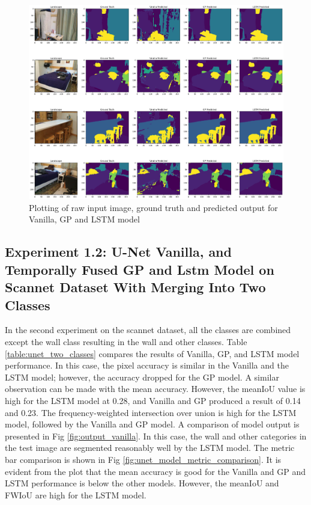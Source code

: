 	\begin{figure}
		\centering
		\includegraphics[width=16cm]{images/unet_scannet_all_classes.png}
		\caption{Plotting of raw input image, ground truth and predicted output for Vanilla, GP and LSTM model}
		\label{fig:unet_model}
	\end{figure}

	\newpage
		
    \subsection{Experiment 1.2: U-Net Vanilla, and Temporally Fused GP and Lstm Model on Scannet Dataset With Merging Into Two Classes}
    
	In the second experiment on the scannet dataset, all the classes are combined except the wall class resulting in the wall and other classes. Table \ref{table:unet_two_classes} compares the results of Vanilla, GP, and LSTM model performance. In this case, the pixel accuracy is similar in the Vanilla and the LSTM model; however, the accuracy dropped for the GP model. A similar observation can be made with the mean accuracy. However, the meanIoU value is high for the LSTM model at 0.28, and Vanilla and GP produced a result of 0.14 and 0.23. The frequency-weighted intersection over union is high for the LSTM model, followed by the Vanilla and GP model. A comparison of model output is presented in Fig \ref{fig:output_vanilla}. In this case, the wall and other categories in the test image are segmented reasonably well by the LSTM model. The metric bar comparison is shown in Fig \ref{fig:unet_model_metric_comparison}. It is evident from the plot that the mean accuracy is good for the Vanilla and GP and LSTM performance is below the other models. However, the meanIoU and FWIoU are high for the LSTM model.

